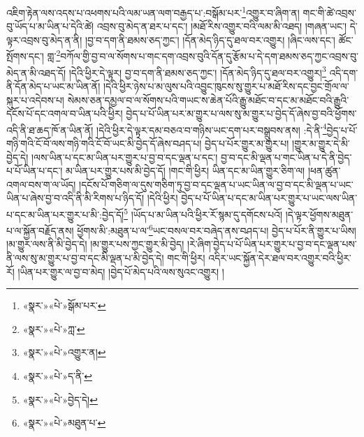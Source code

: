 འཇིག་རྟེན་ལས་འདས་པ་འཕགས་པའི་ལམ་ཡན་ལག་བརྒྱད་པ་:བསྒོམ་པར་\footnote{«སྣར་»«པེ་»སྒོམ་པར་}འགྱུར་བ་ཞིག་ན། གང་གི་ཚེ་འབྲས་བུ་ཡོད་པ་མ་ཡིན་པ་དེའི་ཚེ། འབྲས་བུ་མེད་ན་ཐར་པ་དང་། །མཐོ་རིས་འགྱུར་བའི་ལམ་མི་འཐད། །གཞན་ཡང་། དེ་ལྟར་འབྲས་བུ་མེད་ན་ནི། །བྱ་བ་དག་ནི་ཐམས་ཅད་ཀྱང་། །དོན་མེད་ཉིད་དུ་ཐལ་བར་འགྱུར། །ཞིང་ལས་དང་། ཚོང་སྤོགས་དང་། གླ་\footnote{«སྣར་»«པེ་»ཀླ་}བཀོལ་གྱི་བྱ་བ་ལ་སོགས་པ་གང་དག་འབྲས་བུའི་དོན་དུ་རྩོམ་པ་དེ་དག་ཐམས་ཅད་ཀྱང་འབྲས་བུ་མེད་ན་མི་འཐད་དོ། །དེའི་ཕྱིར་དེ་ལྟར། བྱ་བ་དག་ནི་ཐམས་ཅད་ཀྱང་། །དོན་མེད་ཉིད་དུ་ཐལ་བར་འགྱུར།\footnote{«སྣར་»«པེ་»འགྱུར་ན།} འདི་དག་ནི་དོན་མེད་པ་ཡང་མ་ཡིན་ནོ། །དེའི་ཕྱིར་ཉེས་པ་མ་ལུས་པའི་འབྱུང་ཁུངས་སུ་གྱུར་པ་མཐོ་རིས་དང་བྱང་གྲོལ་ལ་སྐུར་པ་འདེབས་པ། སེམས་ཅན་དམྱལ་བ་ལ་སོགས་པའི་གཡང་ས་ཆེན་པོའི་རྒྱུ་མཐོང་བ་དང་མ་མཐོང་བའི་རྒྱུའི་དངོས་པོ་དང་འགལ་བ་ཡིན་པའི་ཕྱིར། བྱེད་པ་པོ་ཡིན་པར་མ་གྱུར་པ་ལས་སུ་མ་གྱུར་པ་བྱེད་དོ་ཞེས་བྱ་བའི་ཕྱོགས་འདི་ནི་ཐ་ཆད་ཁོ་ན་ཡིན་ནོ། །དེའི་ཕྱིར་དེ་ལྟར་དམ་བཅའ་བ་གཉིས་ཡང་དག་པར་བསྒྲུབས་ནས། :དེ་ནི་\footnote{«སྣར་»«པེ་»ད་ནི་}བྱེད་པ་པོ་གཉི་གའི་ངོ་བོ་ལས་གཉི་གའི་ངོ་བོ་ཡང་མི་བྱེད་དོ་ཞེས་བཤད་པ། བྱེད་པ་པོར་གྱུར་མ་གྱུར་པ། །གྱུར་མ་གྱུར་དེ་མི་བྱེད་དེ། །ལས་ཡིན་པ་དང་མ་ཡིན་པར་གྱུར་པ་བྱ་བ་དང་ལྡན་པ་དང་། བྱ་བ་དང་མི་ལྡན་པ་གང་ཡིན་པ་དེ་ནི་བྱེད་པ་པོ་ཡིན་པ་དང་། མ་ཡིན་པར་གྱུར་པས་མི་བྱེད་དོ། །གང་གི་ཕྱིར། ཡིན་དང་མ་ཡིན་གྱུར་ཅིག་ལ། །ཕན་ཚུན་འགལ་བས་ག་ལ་ཡོད། །དངོས་པོ་གཅིག་ལ་དུས་གཅིག་ཏུ་བྱ་བ་དང་ལྡན་པ་ཡང་ཡིན་ལ་བྱ་བ་དང་མི་ལྡན་པ་ཡང་ཡིན་པ་ཞེས་བྱ་བ་འདི་ནི་མི་རིགས་པ་ཉིད་དོ། །དེའི་ཕྱིར། བྱེད་པ་པོ་ཡིན་པ་དང་མ་ཡིན་པར་གྱུར་པ་ཡང་ལས་ཡིན་པ་དང་མ་ཡིན་པར་གྱུར་པ་མི་:བྱེད་དོ།\footnote{«སྣར་»«པེ་»བྱེད་དེ།} །ཡོད་པ་མ་ཡིན་པའི་ཕྱིར་རོ་སྙམ་དུ་དགོངས་པའོ། །དེ་ལྟར་ཕྱོགས་མཐུན་པ་ལ་སྐྱོན་བརྗོད་ནས། ཕྱོགས་མི་:མཐུན་པ་ལ་\footnote{«སྣར་»«པེ་»མཐུན་པ་}ཡང་བསལ་བར་བཞེད་ནས་བཤད་པ། བྱེད་པ་པོར་ནི་གྱུར་པ་ཡིས། །མ་གྱུར་ལས་ནི་མི་བྱེད་དེ། །མ་གྱུར་པས་ཀྱང་གྱུར་མི་བྱེད། །རེ་ཞིག་བྱེད་པ་པོ་ཡིན་པར་གྱུར་པ་བྱ་བ་དང་ལྡན་པས་ནི་ལས་སུ་མ་གྱུར་པ་བྱ་བ་དང་མི་ལྡན་པ་མི་བྱེད་དེ། གང་གི་ཕྱིར། འདིར་ཡང་སྐྱོན་དེར་ཐལ་བར་འགྱུར་བའི་ཕྱིར་རོ། །ཡིན་པར་གྱུར་ལ་བྱ་བ་མེད། །བྱེད་པོ་མེད་པའི་ལས་སུའང་འགྱུར། །
